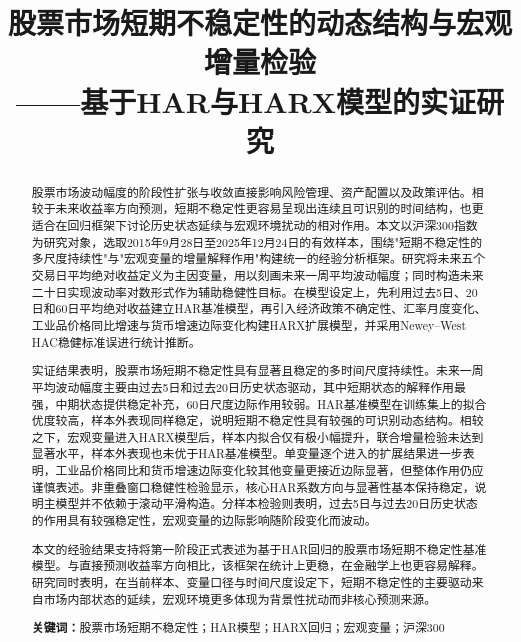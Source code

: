 \documentclass[12pt,a4paper,fontset=fandol]{ctexart}
\title{\textbf{股票市场短期不稳定性的动态结构与宏观增量检验\\——基于HAR与HARX模型的实证研究}}
\author{}
\date{}
\begin{document}
\maketitle

\begin{abstract}
\noindent 股票市场波动幅度的阶段性扩张与收敛直接影响风险管理、资产配置以及政策评估。相较于未来收益率方向预测，短期不稳定性更容易呈现出连续且可识别的时间结构，也更适合在回归框架下讨论历史状态延续与宏观环境扰动的相对作用。本文以沪深300指数为研究对象，选取2015年9月28日至2025年12月24日的有效样本，围绕"短期不稳定性的多尺度持续性"与"宏观变量的增量解释作用"构建统一的经验分析框架。研究将未来五个交易日平均绝对收益定义为主因变量，用以刻画未来一周平均波动幅度；同时构造未来二十日实现波动率对数形式作为辅助稳健性目标。在模型设定上，先利用过去5日、20日和60日平均绝对收益建立HAR基准模型，再引入经济政策不确定性、汇率月度变化、工业品价格同比增速与货币增速边际变化构建HARX扩展模型，并采用Newey--West HAC稳健标准误进行统计推断。

实证结果表明，股票市场短期不稳定性具有显著且稳定的多时间尺度持续性。未来一周平均波动幅度主要由过去5日和过去20日历史状态驱动，其中短期状态的解释作用最强，中期状态提供稳定补充，60日尺度边际作用较弱。HAR基准模型在训练集上的拟合优度较高，样本外表现同样稳定，说明短期不稳定性具有较强的可识别动态结构。相较之下，宏观变量进入HARX模型后，样本内拟合仅有极小幅提升，联合增量检验未达到显著水平，样本外表现也未优于HAR基准模型。单变量逐个进入的扩展结果进一步表明，工业品价格同比和货币增速边际变化较其他变量更接近边际显著，但整体作用仍应谨慎表述。非重叠窗口稳健性检验显示，核心HAR系数方向与显著性基本保持稳定，说明主模型并不依赖于滚动平滑构造。分样本检验则表明，过去5日与过去20日历史状态的作用具有较强稳定性，宏观变量的边际影响随阶段变化而波动。

本文的经验结果支持将第一阶段正式表述为基于HAR回归的股票市场短期不稳定性基准模型。与直接预测收益率方向相比，该框架在统计上更稳，在金融学上也更容易解释。研究同时表明，在当前样本、变量口径与时间尺度设定下，短期不稳定性的主要驱动来自市场内部状态的延续，宏观环境更多体现为背景性扰动而非核心预测来源。

\vspace{1em}
\noindent\textbf{关键词：}股票市场短期不稳定性；HAR模型；HARX回归；宏观变量；沪深300
\end{abstract}

\thispagestyle{fancy}

\newpage
\tableofcontents

\newpage







\end{document}
